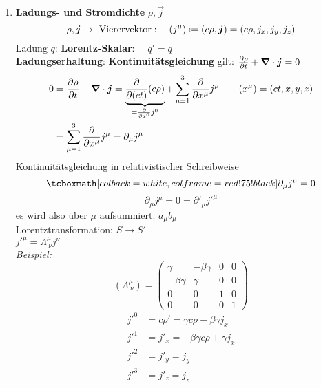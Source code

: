 \begin{enumerate}[1)]
	\item \textbf{Ladungs- und Stromdichte} $ \rho, \vec{j} $
	\begin{equation*}
	\rho , \vec{j} \to \tx{ Vierervektor}: \quad (j^{\mu}) \defeq ( c \rho, \vec{j}) = ( c \rho, j_x, j_y, j_z) 
	\end{equation*}
	Ladung $ q $: \textbf{Lorentz-Skalar}: $ \quad q' = q $\\
	\textbf{Ladungserhaltung}: \textbf{Kontinuitätsgleichung} gilt: $ \frac{\partial \rho}{\partial t} + \bm{\nabla} \cdot \bm{j} = 0 $
	\begin{align*}
	0 &= \frac{\partial \rho}{\partial t} + \bm{\nabla} \cdot \bm{j} = \underbrace{\frac{\partial }{\partial (ct)} (c \rho)}_{= \frac{\partial }{\partial x^{0}} j^{0}} + \sum_{\mu=1}^{3} \frac{\partial }{\partial x^{\mu}} j^{\mu} \qquad (x^{\mu}) = (ct, x, y, z)\\
	&= \sum_{\mu=1}^{3} \frac{\partial }{\partial x^{\mu}} j^{\mu} = \partial_{\mu} j^{\mu}
	\end{align*}
	Kontinuitätsgleichung in relativistischer Schreibweise
	\begin{equation*}
	\rmbox{\partial _{\mu} j^{\mu} = 0}
	\end{equation*}
	\begin{equation*}
	\partial_{\mu} j^{\mu} = 0 = \partial'_{\mu} j'^{\mu}
	\end{equation*}
	es wird also über $ \mu $ aufsummiert: $ a_{\mu} b_{\mu} $\\[10pt]
	Lorentztransformation: $ S \to S' $\\
	$ j'^{\mu} = \Lambda^{\mu}_{\ \nu} j^{\nu} $\\
	\emph{Beispiel:}
	\begin{equation*}
	\left(\Lambda ^{\mu}_{\ \nu}\right) = \begin{pmatrix}
	\gamma & - \beta \gamma & 0 & 0 \\
	- \beta \gamma & \gamma & 0 & 0 \\
	0 & 0 & 1 & 0 \\
	0 & 0 & 0 & 1
	\end{pmatrix}
	\end{equation*}
	\begin{align*}
	j'^{0} &= c\rho ' = \gamma c \rho - \beta \gamma j_x \\
	j'^{1} &= j'_{x} = - \beta \gamma c \rho + \gamma j_x \\
	j'^{2} &= j'_{y} = j_y \\
	j'^{3} &= j'_{z} = j_z \\
	\end{align*}

\end{enumerate}
